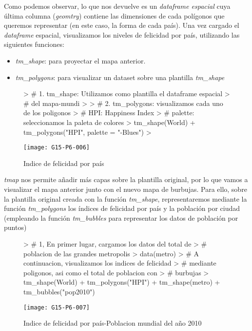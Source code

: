 \documentclass [a4paper] {article}
\begin{document}
Como podemos observar, lo que nos devuelve es un \textit{dataframe espacial} cuya última columna (\textit{geomtry}) contiene las dimensiones de cada polígonos que queremos representar (en este caso, la forma de cada país).
Una vez cargado el \textit{dataframe} espacial, visualizamos los niveles de felicidad por país, utilizando las siguientes funciones:
\begin{itemize}
  \item \textit{tm\_shape}: para proyectar el mapa anterior.
  \item \textit{tm\_polygons}: para visualizar un dataset sobre una plantilla \textit{tm\_shape}
\end{itemize}
\begin{figure}[htbp!]
\centering
\begin{Schunk}
\begin{Sinput}
> # 1. tm_shape: Utilizamos como plantilla el dataframe espacial
> # del mapa-mundi
> 
> # 2. tm_polygons: visualizamos cada uno de los poligonos
> # HPI: Happiness Index
> # palette: seleccionamos la paleta de colores
> tm_shape(World) + tm_polygons("HPI", palette = "-Blues")
> 
\end{Sinput}
\end{Schunk}
\texttt{[image: G15-P6-006]}
\caption{Indice de felicidad por país}
\end{figure}
\newpage
\textit{tmap} nos permite añadir más capas sobre la plantilla original, por lo que vamos a visualizar el mapa anterior junto con el nuevo mapa de burbujas. Para ello, sobre la plantilla original creada con la función \textit{tm\_shape}, representaremos mediante la función \textit{tm\_polygons} los índices de felicidad por país y la población por ciudad (empleando la función \textit{tm\_bubbles} para representar los datos de población por puntos)
\begin{figure}[htbp!]
\centering
\begin{Schunk}
\begin{Sinput}
> # 1, En primer lugar, cargamos los datos del total de
> # poblacion de las grandes metropolis
> data(metro)
> # A continuacion, visualizamos los indices de felicidad
> # mediante poligonos, asi como el total de poblacion con
> # burbujas
> tm_shape(World) + tm_polygons("HPI") + tm_shape(metro) + tm_bubbles("pop2010")
\end{Sinput}
\end{Schunk}
\texttt{[image: G15-P6-007]}
\caption{Indice de felicidad por país-Poblacion mundial del año 2010}
\end{figure}
\newpage
\end{document}
